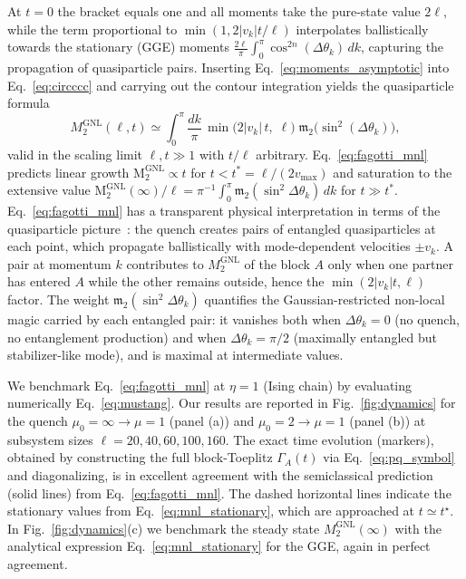 \documentclass[prx,twocolumn,superscriptaddress,aps,10pt, frontmatterverbose, reprint,footinbib,longbibliography=true]{revtex4-2}
\newcommand{\NL}{\mathrm{GNL}}
\newcommand{\MNL}{\mathrm{M}_2^{\NL}}
\begin{document}
At $t=0$ the bracket equals one and all moments take the pure-state value $2\ell$, while the term proportional to $\min(1,2|v_k|t/\ell)$ interpolates ballistically towards  the stationary (GGE) moments $\frac{2\ell}{\pi}\int_0^\pi\cos^{2n}(\Delta\theta_k)\,dk$, capturing the propagation of quasiparticle pairs.
Inserting Eq.~\eqref{eq:moments_asymptotic} into  Eq.~\eqref{eq:circccc} and carrying out the contour integration yields the quasiparticle formula
\begin{equation}
    M_2^{\mathrm{GNL}}(\ell,t) \simeq \int_0^\pi\!\frac{dk}{\pi}\,\min\!\bigl(2|v_k|\,t,\;\ell\bigr)\;\mathfrak{m}_2\!\bigl(\sin^2(\Delta\theta_k)\bigr),
    \label{eq:fagotti_mnl}
\end{equation}
valid in the scaling limit $\ell, t \gg 1$ with $t/\ell$ arbitrary.
Eq.~\eqref{eq:fagotti_mnl} predicts linear growth $\MNL \propto t$ for $t < t^* = \ell/(2v_{\max})$ and saturation to the extensive value $\MNL(\infty)/\ell = \pi^{-1}\int_0^\pi \mathfrak{m}_2(\sin^2\!\Delta\theta_k)\, dk$ for $t \gg t^*$.
Eq.~\eqref{eq:fagotti_mnl} has a transparent physical interpretation in terms of the quasiparticle picture~\cite{Calabrese2005evolution,Fagotti2008}: the quench creates pairs of entangled quasiparticles at each point, which propagate ballistically with mode-dependent velocities $\pm v_k$.
A pair at momentum $k$ contributes to $M_2^{\mathrm{GNL}}$ of the block $A$ only when one partner has entered $A$ while the other remains outside, hence the $\min(2|v_k|t,\ell)$ factor.
The weight $\mathfrak{m}_2(\sin^2\Delta\theta_k)$  quantifies the Gaussian-restricted non-local magic carried by each entangled pair: it vanishes both when $\Delta\theta_k = 0$ (no quench, no entanglement production) and when $\Delta\theta_k = \pi/2$ (maximally entangled but stabilizer-like mode), and is maximal at intermediate values.

We benchmark Eq.~\eqref{eq:fagotti_mnl} at $\eta=1$ (Ising chain) by  evaluating numerically Eq.~\eqref{eq:mustang}. 
Our results are reported in Fig.~\ref{fig:dynamics} for the quench $\mu_0 = \infty \to \mu = 1$ (panel (a))  and $\mu_0 = 2 \to \mu = 1$ (panel (b)) at subsystem sizes $\ell = 20, 40, 60, 100, 160$. 
The exact time evolution (markers), obtained by constructing the full block-Toeplitz $\Gamma_A(t)$ via Eq.~\eqref{eq:pq_symbol} and diagonalizing, is in excellent agreement with the semiclassical prediction (solid lines) from Eq.~\eqref{eq:fagotti_mnl}.
The dashed horizontal lines indicate the stationary values from Eq.~\eqref{eq:mnl_stationary}, which are approached at $t \simeq t^\star$.
In Fig.~\ref{fig:dynamics}(c) we benchmark the steady state $M_2^{\mathrm{GNL}}(\infty)$ with the analytical expression Eq.~\eqref{eq:mnl_stationary} for the GGE, again in perfect agreement. 
\end{document}
